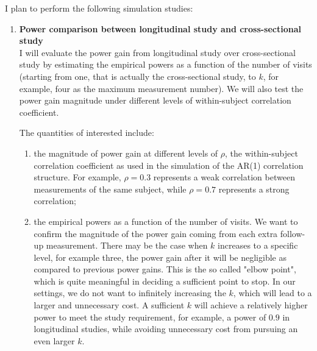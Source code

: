 \documentclass[12pt]{article}
\begin{document}
I plan to perform the following simulation studies:
\begin{enumerate}
\item \textbf{Power comparison between longitudinal study and cross-sectional study}\\
I will evaluate the power gain from longitudinal study over cross-sectional study by estimating the empirical powers as a function of the number of visits (starting from one, that is actually the cross-sectional study, to $k$, for example, four as the maximum measurement number). We will also test the power gain magnitude under different levels of within-subject correlation coefficient.

The quantities of interested include:
\begin{enumerate}
\item the magnitude of power gain at different levels of $\rho$, the within-subject correlation coefficient as used in the simulation of the AR(1) correlation structure. For example, $\rho = 0.3$ represents a weak correlation between measurements of the same subject, while $\rho = 0.7$ represents a strong correlation; 
\item the empirical powers as a function of the number of visits. We want to confirm the magnitude of the power gain coming from each extra follow-up measurement. There may be the case when $k$ increases to a specific level, for example three, the power gain after it will be negligible as compared to previous power gains. This is the so called "elbow point", which is quite meaningful in deciding a sufficient point to stop. In our settings, we do not want to infinitely increasing the $k$, which will lead to a larger and unnecessary cost. A sufficient $k$ will achieve a relatively higher power to meet the study requirement, for example, a power of $0.9$ in longitudinal studies, while avoiding unnecessary cost from pursuing an even larger $k$.
\end{enumerate}




\end{enumerate}
\end{document}
